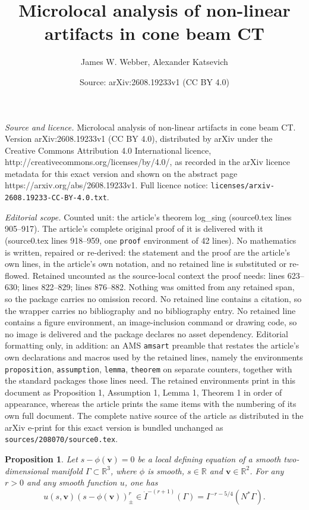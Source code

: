 \documentclass[10pt,a4paper]{amsart}
\title{Microlocal analysis of non-linear artifacts in cone beam CT}
\author{James W. Webber, Alexander Katsevich}
\date{Source: arXiv:2608.19233v1 (CC BY 4.0)}
\newtheorem{proposition}{Proposition}
\newcommand{\be}{\begin{equation}}
\newcommand{\br}{\mathbb{R}}
\newcommand{\ee}{\end{equation}}
\newcommand{\vv}{\mathbf{v}}
\begin{document}
\maketitle

\noindent\emph{Source and licence.} Microlocal analysis of non-linear artifacts in cone beam CT. Version arXiv:2608.19233v1 (CC BY 4.0), distributed by arXiv under the Creative Commons Attribution 4.0 International licence, http://creativecommons.org/licenses/by/4.0/, as recorded in the arXiv licence metadata for this exact version and shown on the abstract page https://arxiv.org/abs/2608.19233v1. Full licence notice: \texttt{licenses/arxiv-2608.19233-CC-BY-4.0.txt}.\par\smallskip

\noindent\textit{Editorial scope.} Counted unit: the article's theorem log\_sing (source0.tex lines 905--917). The article's complete original proof of it is delivered with it (source0.tex lines 918--959, one \texttt{proof} environment of 42 lines). No mathematics is written, repaired or re-derived: the statement and the proof are the article's own lines, in the article's own notation, and no retained line is substituted or re-flowed.  Retained uncounted as the source-local context the proof needs: lines 623--630; lines 822--829; lines 876--882.  Nothing was omitted from any retained span, so the package carries no omission record.  No retained line contains a citation, so the wrapper carries no bibliography and no bibliography entry.  No retained line contains a figure environment, an image-inclusion command or drawing code, so no image is delivered and the package declares no asset dependency.  Editorial formatting only, in addition: an AMS \texttt{amsart} preamble that restates the article's own declarations and macros used by the retained lines, namely the environments \texttt{proposition}, \texttt{assumption}, \texttt{lemma}, \texttt{theorem} on separate counters, together with the standard packages those lines need.  The retained environments print in this document as Proposition 1, Assumption 1, Lemma 1, Theorem 1 in order of appearance, whereas the article prints the same items with the numbering of its own full document.  The complete native source of the article as distributed in the arXiv e-print for this exact version is bundled unchanged as \texttt{sources/208070/source0.tex}.
\begin{proposition}
\label{prop_sqrt}
Let $s - \phi(\vv) = 0$ be a local defining equation of a smooth two-dimensional manifold $\Gamma\subset\br^3$, where $\phi$ is smooth, $s\in \br$ and $\vv \in \br^2$. For any $r >0$ and any smooth function $u$, one has
\be
\label{dist_order_0}
u(s,\vv)(s - \phi(\vv))^r_\pm \in \dot{I}^{-(r+1)}(\Gamma)=I^{-r-5/4}(N^*\Gamma).
\ee
\end{proposition}
\end{document}
